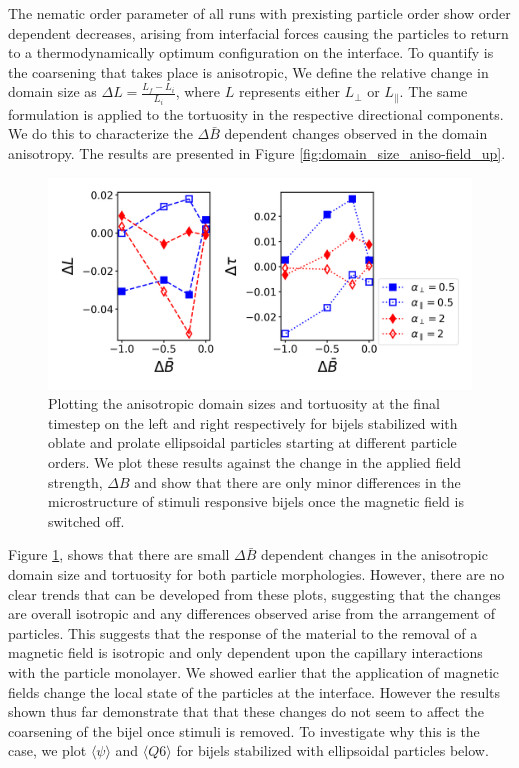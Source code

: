 The nematic order parameter of all runs with prexisting particle order
show order dependent decreases, arising from interfacial forces causing
the particles to return to a thermodynamically optimum configuration on
the interface. To quantify is the coarsening that takes place is
anisotropic, We define the relative change in domain size as
$\Delta L = \frac{L_{f} - L_{i}}{L_{i}}$, where $L$ represents
either $L_{\perp}$ or $L_{\parallel}$. The same formulation is
applied to the tortuosity in the respective directional components. We
do this to characterize the $\Delta \bar{B}$ dependent changes
observed in the domain anisotropy. The results are presented in Figure
\ref{fig:domain_size_aniso-field_up}.

\begin{figure} 
\centering 
\includegraphics[scale = 0.5]{../figures/results/paper2/domain_size_aniso-field_down.png} 
\caption{Plotting the anisotropic domain sizes and tortuosity at the final timestep on the left and right respectively for bijels stabilized with oblate and 
         prolate ellipsoidal particles starting at different particle orders. We plot these results against the change in the applied field strength, 
         $\Delta B$ and show that there are only minor differences in the microstructure of stimuli responsive bijels once the magnetic field is switched off.} 
\label{fig:domain_size_aniso-field_down} 
\end{figure}

Figure \ref{fig:domain_size_aniso-field_down}, shows that there are
small $\Delta \bar{B}$ dependent changes in the anisotropic domain
size and tortuosity for both particle morphologies. However, there are
no clear trends that can be developed from these plots, suggesting that
the changes are overall isotropic and any differences observed arise
from the arrangement of particles. This suggests that the response of
the material to the removal of a magnetic field is isotropic and only
dependent upon the capillary interactions with the particle monolayer.
We showed earlier that the application of magnetic fields change the
local state of the particles at the interface. However the results shown
thus far demonstrate that that these changes do not seem to affect the
coarsening of the bijel once stimuli is removed. To investigate why this
is the case, we plot $\langle \psi \rangle$ and
$\langle Q6 \rangle$ for bijels stabilized with ellipsoidal particles
below.

